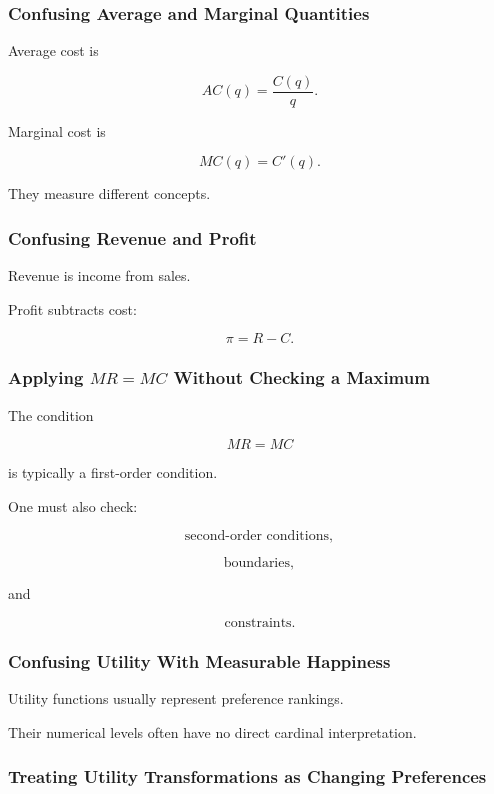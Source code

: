\subsubsection{Confusing Average and Marginal Quantities}

Average cost is

\[
AC(q)
=
\frac{C(q)}{q}.
\]

Marginal cost is

\[
MC(q)
=
C'(q).
\]

They measure different concepts.

\subsubsection{Confusing Revenue and Profit}

Revenue is income from sales.

Profit subtracts cost:

\[
\boxed{
\pi=R-C.
}
\]

\subsubsection{Applying \(MR=MC\) Without Checking a Maximum}

The condition

\[
MR=MC
\]

is typically a first-order condition.

One must also check:

\[
\boxed{
\text{second-order conditions},
}
\]

\[
\boxed{
\text{boundaries},
}
\]

and

\[
\boxed{
\text{constraints}.
}
\]

\subsubsection{Confusing Utility With Measurable Happiness}

Utility functions usually represent preference rankings.

Their numerical levels often have no direct cardinal interpretation.

\subsubsection{Treating Utility Transformations as Changing Preferences}

